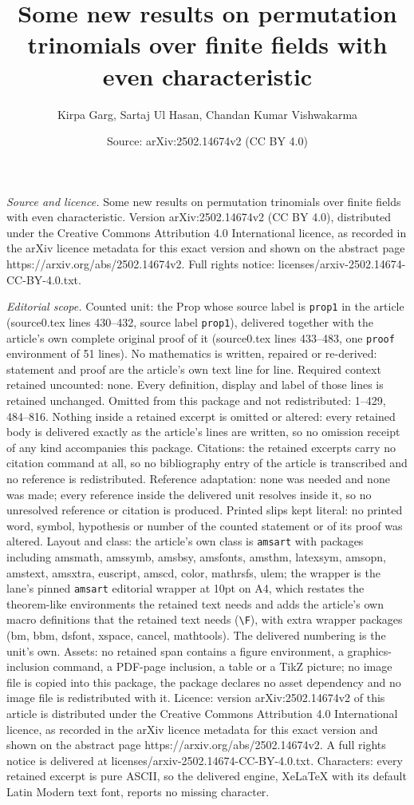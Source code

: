 \documentclass[10pt,a4paper]{amsart}
\title[Some new results on permutation trinomials over finite field]{Some new results on permutation trinomials over finite fields with even characteristic}
\author{Kirpa Garg, Sartaj Ul Hasan, Chandan Kumar Vishwakarma}
\date{Source: arXiv:2502.14674v2 (CC BY 4.0)}
\begin{document}
\maketitle

\noindent\emph{Source and licence.} Some new results on permutation trinomials over finite fields with even characteristic. Version arXiv:2502.14674v2 (CC BY 4.0), distributed under the Creative Commons Attribution 4.0 International licence, as recorded in the arXiv licence metadata for this exact version and shown on the abstract page https://arxiv.org/abs/2502.14674v2. Full rights notice: licenses/arxiv-2502.14674-CC-BY-4.0.txt.\par\smallskip

\noindent\textit{Editorial scope.} Counted unit: the Prop whose source label is \texttt{prop1} in the article (source0.tex lines 430--432, source label \texttt{prop1}), delivered together with the article's own complete original proof of it (source0.tex lines 433--483, one \texttt{proof} environment of 51 lines). No mathematics is written, repaired or re-derived: statement and proof are the article's own text line for line. Required context retained uncounted: none. Every definition, display and label of those lines is retained unchanged. Omitted from this package and not redistributed: 1--429, 484--816. Nothing inside a retained excerpt is omitted or altered: every retained body is delivered exactly as the article's lines are written, so no omission receipt of any kind accompanies this package. Citations: the retained excerpts carry no citation command at all, so no bibliography entry of the article is transcribed and no reference is redistributed. Reference adaptation: none was needed and none was made; every reference inside the delivered unit resolves inside it, so no unresolved reference or citation is produced. Printed slips kept literal: no printed word, symbol, hypothesis or number of the counted statement or of its proof was altered. Layout and class: the article's own class is \texttt{amsart} with packages including amsmath, amssymb, amsbsy, amsfonts, amsthm, latexsym, amsopn, amstext, amsxtra, euscript, amscd, color, mathrsfs, ulem; the wrapper is the lane's pinned \texttt{amsart} editorial wrapper at 10pt on A4, which restates the theorem-like environments the retained text needs and adds the article's own macro definitions that the retained text needs (\texttt{\textbackslash F}), with extra wrapper packages (bm, bbm, dsfont, xspace, cancel, mathtools). The delivered numbering is the unit's own. Assets: no retained span contains a figure environment, a graphics-inclusion command, a PDF-page inclusion, a table or a TikZ picture; no image file is copied into this package, the package declares no asset dependency and no image file is redistributed with it. Licence: version arXiv:2502.14674v2 of this article is distributed under the Creative Commons Attribution 4.0 International licence, as recorded in the arXiv licence metadata for this exact version and shown on the abstract page https://arxiv.org/abs/2502.14674v2. A full rights notice is delivered at licenses/arxiv-2502.14674-CC-BY-4.0.txt. Characters: every retained excerpt is pure ASCII, so the delivered engine, XeLaTeX with its default Latin Modern text font, reports no missing character.
\end{document}
